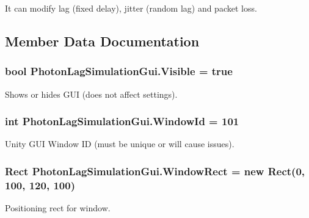 It can modify lag (fixed delay), jitter (random lag) and packet loss. 

\subsection{Member Data Documentation}
\subsubsection[{\texorpdfstring{Visible}{Visible}}]{\setlength{\rightskip}{0pt plus 5cm}bool Photon\+Lag\+Simulation\+Gui.\+Visible = true}\hypertarget{class_photon_lag_simulation_gui_ad790a872afa4c4c1b34401f55982203a}{}\label{class_photon_lag_simulation_gui_ad790a872afa4c4c1b34401f55982203a}


Shows or hides G\+UI (does not affect settings).

\subsubsection[{\texorpdfstring{Window\+Id}{WindowId}}]{\setlength{\rightskip}{0pt plus 5cm}int Photon\+Lag\+Simulation\+Gui.\+Window\+Id = 101}\hypertarget{class_photon_lag_simulation_gui_a0e20da80809bd2181828edabed39ccc9}{}\label{class_photon_lag_simulation_gui_a0e20da80809bd2181828edabed39ccc9}


Unity G\+UI Window ID (must be unique or will cause issues).

\subsubsection[{\texorpdfstring{Window\+Rect}{WindowRect}}]{\setlength{\rightskip}{0pt plus 5cm}Rect Photon\+Lag\+Simulation\+Gui.\+Window\+Rect = new Rect(0, 100, 120, 100)}\hypertarget{class_photon_lag_simulation_gui_a1d267bda81b30f6b32f77e4b5cc90649}{}\label{class_photon_lag_simulation_gui_a1d267bda81b30f6b32f77e4b5cc90649}


Positioning rect for window.



